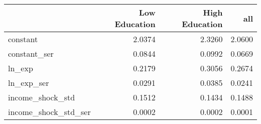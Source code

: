 \begin{tabular}{lrrr}
\toprule
 & Low Education & High Education & all \\
\midrule
constant & 2.0374 & 2.3260 & 2.0600 \\
constant_ser & 0.0844 & 0.0992 & 0.0669 \\
ln_exp & 0.2179 & 0.3056 & 0.2674 \\
ln_exp_ser & 0.0291 & 0.0385 & 0.0241 \\
income_shock_std & 0.1512 & 0.1434 & 0.1488 \\
income_shock_std_ser & 0.0002 & 0.0002 & 0.0001 \\
\bottomrule
\end{tabular}
